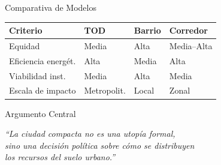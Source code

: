 \begin{frame}{Comparativa de Modelos}
  \begin{table}
    \centering
    \small
    \begin{tabularx}{\textwidth}{@{} l X X X @{}}
      \toprule
      \textbf{Criterio}   & \textbf{TOD} & \textbf{Barrio} & \textbf{Corredor} \\
      \midrule
      Equidad             & Media        & Alta            & Media--Alta \\
      Eficiencia energét. & Alta         & Media           & Alta \\
      Viabilidad inst.    & Media        & Alta            & Media \\
      Escala de impacto   & Metropolit.  & Local           & Zonal \\
      \bottomrule
    \end{tabularx}
  \end{table}
\end{frame}

\begin{frame}{Argumento Central}
  \vfill
  \begin{center}
    \color{ColorPrincipal}
    \Large\itshape
    ``La ciudad compacta no es una utopía formal,\\
    sino una decisión política sobre cómo se distribuyen\\
    los recursos del suelo urbano.''
  \end{center}
  \vfill
\end{frame}

